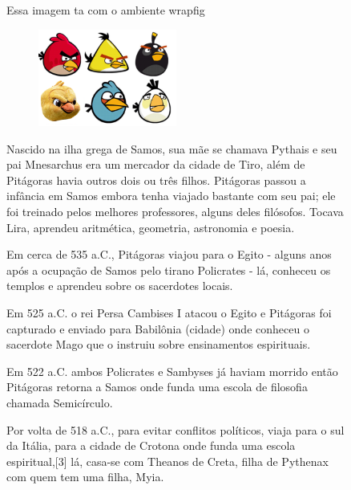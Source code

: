 \documentclass[a4paper,11pt]{report}
\begin{document}
\begin{figure}[htbp]
\section{}
Essa imagem ta com o ambiente wrapfig
\begin{figure}
\includegraphics[width=0.5\textwidth]{Pistola_Birds.png}
\end{figure}

\hspace{.75cm}Nascido na ilha grega de Samos, sua mãe se chamava Pythais e seu pai Mnesarchus era um mercador da cidade de Tiro, além de Pitágoras havia outros dois ou três filhos. Pitágoras passou a infância em Samos embora tenha viajado bastante com seu pai; ele foi treinado pelos melhores professores, alguns deles filósofos. Tocava Lira, aprendeu aritmética, geometria, astronomia e poesia.

\hspace{.75cm}Em cerca de 535 a.C., Pitágoras viajou para o Egito - alguns anos após a ocupação de Samos pelo tirano Policrates - lá, conheceu os templos e aprendeu sobre os sacerdotes locais.

\hspace{.75cm}Em 525 a.C. o rei Persa Cambises I atacou o Egito e Pitágoras foi capturado e enviado para Babilônia (cidade) onde conheceu o sacerdote Mago que o instruiu sobre ensinamentos espirituais.

\hspace{.75cm}Em 522 a.C. ambos Policrates e Sambyses já haviam morrido então Pitágoras retorna a Samos onde funda uma escola de filosofia chamada Semicírculo.

\hspace{.75cm}Por volta de 518 a.C., para evitar conflitos políticos, viaja para o sul da Itália, para a cidade de Crotona onde funda uma escola espiritual,[3] lá, casa-se com Theanos de Creta, filha de Pythenax com quem tem uma filha, Myia.
\end{figure}
\end{document}
